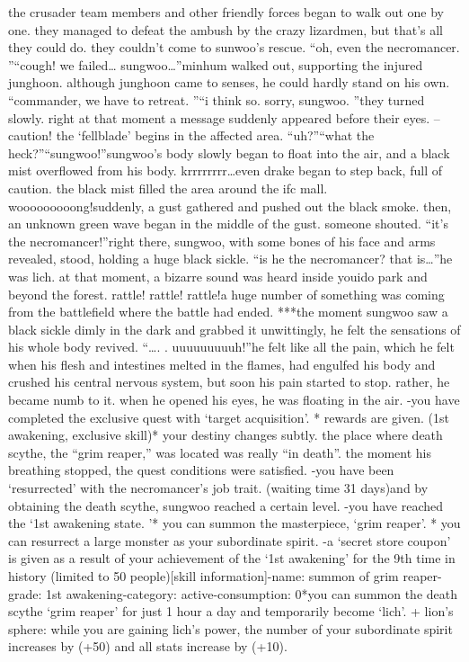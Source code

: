 the crusader team members and other friendly forces began to walk out one by one.
they managed to defeat the ambush by the crazy lizardmen, but that’s all they could do.
 they couldn’t come to sunwoo’s rescue.
“oh, even the necromancer.
”“cough! we failed… sungwoo…”minhum walked out, supporting the injured junghoon.
 although junghoon came to senses, he could hardly stand on his own.
“commander, we have to retreat.
”“i think so.
 sorry, sungwoo.
”they turned slowly.
right at that moment a message suddenly appeared before their eyes.
– caution! the ‘fellblade’ begins in the affected area.
“uh?”“what the heck?”“sungwoo!”sungwoo’s body slowly began to float into the air, and a black mist overflowed from his body.
krrrrrrrr…even drake began to step back, full of caution.
 the black mist filled the area around the ifc mall.
wooooooooong!suddenly, a gust gathered and pushed out the black smoke.
 then, an unknown green wave began in the middle of the gust.
someone shouted.
“it’s the necromancer!”right there, sungwoo, with some bones of his face and arms revealed, stood, holding a huge black sickle.
“is he the necromancer? that is…”he was lich.
at that moment, a bizarre sound was heard inside youido park and beyond the forest.
rattle! rattle! rattle!a huge number of something was coming from the battlefield where the battle had ended.
***the moment sungwoo saw a black sickle dimly in the dark and grabbed it unwittingly, he felt the sensations of his whole body revived.
“….
.
uuuuuuuuuh!”he felt like all the pain, which he felt when his flesh and intestines melted in the flames, had engulfed his body and crushed his central nervous system, but soon his pain started to stop.
 rather, he became numb to it.
when he opened his eyes, he was floating in the air.
-you have completed the exclusive quest  with ‘target acquisition’.
* rewards are given.
 (1st awakening, exclusive skill)* your destiny changes subtly.
the place where death scythe, the “grim reaper,” was located was really “in death”.
 the moment his breathing stopped, the quest conditions were satisfied.
-you have been ‘resurrected’ with the necromancer’s job trait.
 (waiting time 31 days)and by obtaining the death scythe, sungwoo reached a certain level.
-you have reached the ‘1st awakening state.
’* you can summon the masterpiece, ‘grim reaper’.
* you can resurrect a large monster as your subordinate spirit.
-a ‘secret store coupon’ is given as a result of your achievement of the ‘1st awakening’ for the 9th time in history (limited to 50 people)[skill information]-name: summon of grim reaper-grade: 1st awakening-category: active-consumption: 0*you can summon the death scythe ‘grim reaper’ for just 1 hour a day and temporarily become ‘lich’.
+ lion’s sphere: while you are gaining lich’s power, the number of your subordinate spirit increases by (+50) and all stats increase by (+10).


